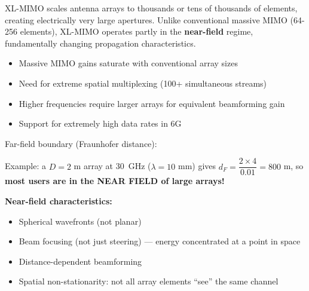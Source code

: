 

\CNchained{}

\CNchained{}

XL-MIMO scales antenna arrays to thousands or tens of thousands of elements, creating electrically very large apertures. Unlike conventional massive MIMO (64-256 elements), XL-MIMO operates partly in the \textbf{near-field} regime, fundamentally changing propagation characteristics.


\begin{itemize}
\tightlist
\item
  Massive MIMO gains saturate with conventional array sizes
\item
  Need for extreme spatial multiplexing (100+ simultaneous streams)
\item
  Higher frequencies require larger arrays for equivalent beamforming gain
\item
  Support for extremely high data rates in 6G
\end{itemize}


Far-field boundary (Fraunhofer distance):


Example: a $D = 2$ m array at 30~GHz ($\lambda = 10$ mm) gives $d_F = \dfrac{2 \times 4}{0.01} = 800$ m, so \textbf{most users are in the NEAR FIELD of large arrays!}

\textbf{Near-field characteristics:}

\begin{itemize}
\tightlist
\item
  Spherical wavefronts (not planar)
\item
  Beam focusing (not just steering) — energy concentrated at a point in space
\item
  Distance-dependent beamforming
\item
  Spatial non-stationarity: not all array elements ``see'' the same channel
\end{itemize}



